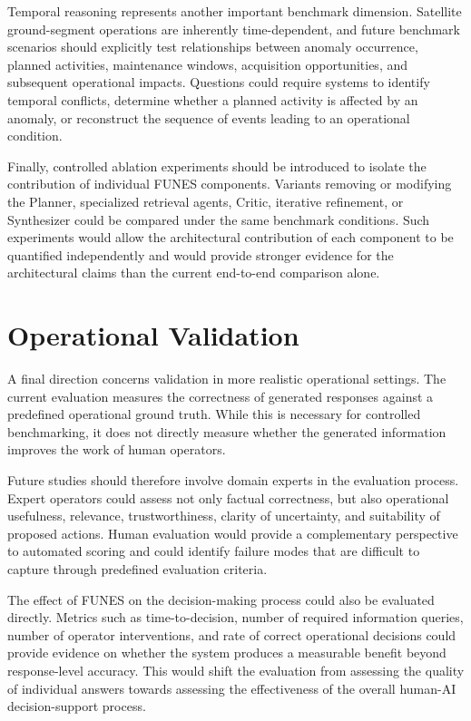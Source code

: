 Temporal reasoning represents another important benchmark dimension. Satellite ground-segment operations are inherently time-dependent, and future benchmark scenarios should explicitly test relationships between anomaly occurrence, planned activities, maintenance windows, acquisition opportunities, and subsequent operational impacts. Questions could require systems to identify temporal conflicts, determine whether a planned activity is affected by an anomaly, or reconstruct the sequence of events leading to an operational condition.

Finally, controlled ablation experiments should be introduced to isolate the contribution of individual FUNES components. Variants removing or modifying the Planner, specialized retrieval agents, Critic, iterative refinement, or Synthesizer could be compared under the same benchmark conditions. Such experiments would allow the architectural contribution of each component to be quantified independently and would provide stronger evidence for the architectural claims than the current end-to-end comparison alone.

\section{Operational Validation}

A final direction concerns validation in more realistic operational settings. The current evaluation measures the correctness of generated responses against a predefined operational ground truth. While this is necessary for controlled benchmarking, it does not directly measure whether the generated information improves the work of human operators.

Future studies should therefore involve domain experts in the evaluation process. Expert operators could assess not only factual correctness, but also operational usefulness, relevance, trustworthiness, clarity of uncertainty, and suitability of proposed actions. Human evaluation would provide a complementary perspective to automated scoring and could identify failure modes that are difficult to capture through predefined evaluation criteria.

The effect of FUNES on the decision-making process could also be evaluated directly. Metrics such as time-to-decision, number of required information queries, number of operator interventions, and rate of correct operational decisions could provide evidence on whether the system produces a measurable benefit beyond response-level accuracy. This would shift the evaluation from assessing the quality of individual answers towards assessing the effectiveness of the overall human-AI decision-support process.

